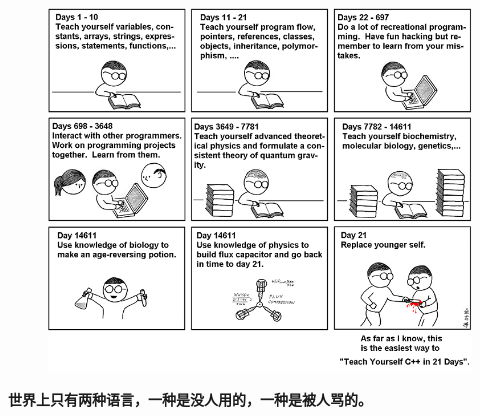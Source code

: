 \begin{figure}[hptb]
  \centering
  \includegraphics[width=\textwidth]{prefix/cpp.png}
\end{figure}
{\bfseries{\LARGE{世界上只有两种语言，一种是没人用的，一种是被人骂的。}}}
\\\\\\\\\\\\\\

